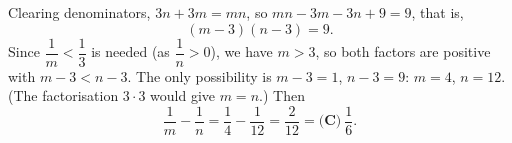 Clearing denominators, $3n+3m=mn$, so $mn-3m-3n+9=9$, that is,
\[(m-3)(n-3)=9.\]
Since $\dfrac{1}{m}<\dfrac{1}{3}$ is needed (as $\dfrac{1}{n}>0$), we have $m>3$, so both factors are positive with $m-3<n-3$. The only possibility is $m-3=1$, $n-3=9$: $m=4$, $n=12$. (The factorisation $3\cdot3$ would give $m=n$.) Then
\[\dfrac{1}{m}-\dfrac{1}{n}=\dfrac{1}{4}-\dfrac{1}{12}=\dfrac{2}{12}=\boxed{\textbf{(C)}\ \dfrac{1}{6}}.\]
